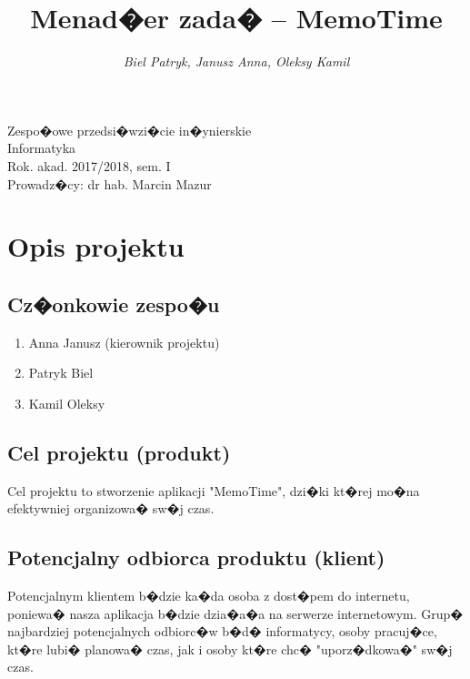 ﻿\documentclass[a4paper]{article}
\title{\bf{Menad�er zada� -- MemoTime}}
\author{{\em Biel Patryk, Janusz Anna, Oleksy Kamil}}
\date{}
\begin{document}
\begin{titlepage}
\maketitle
\thispagestyle{empty}
\bigskip
\begin{center}
Zespo�owe przedsi�wzi�cie in�ynierskie\\[2mm]

Informatyka\\[2mm]

Rok. akad. 2017/2018, sem. I\\[2mm]

Prowadz�cy: dr hab. Marcin Mazur
\end{center}
\end{titlepage}

\tableofcontents
\thispagestyle{empty}

\newpage

\section{Opis projektu}
\label{sec:OpisProjektu}

\subsection{Cz�onkowie zespo�u}
\label{subsec:CzlonkowieZespolu}

\begin{enumerate}
\item Anna Janusz (kierownik projektu)
\item Patryk Biel
\item Kamil Oleksy
\end{enumerate}

\subsection{Cel projektu (produkt)}
\label{subsec:CelProjektu}

Cel projektu to stworzenie aplikacji "MemoTime", dzi�ki kt�rej mo�na efektywniej organizowa� sw�j czas. 

\subsection{Potencjalny odbiorca produktu (klient)}
\label{subsec:PotencjalnyOdbiorcaProduktu}

Potencjalnym klientem b�dzie ka�da osoba z  dost�pem do internetu, poniewa� nasza aplikacja b�dzie dzia�a�a na serwerze internetowym. Grup� najbardziej potencjalnych odbiorc�w b�d� informatycy, osoby pracuj�ce, kt�re lubi� planowa� czas, jak i osoby kt�re chc� "uporz�dkowa�" sw�j czas.
\end{document}
